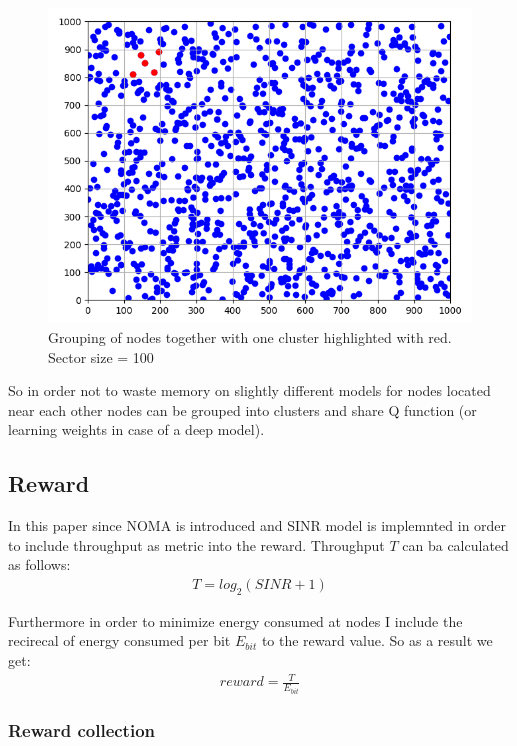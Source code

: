 \begin{figure}[H]
\centering
\includegraphics[scale=0.7]{figures/my_sectors.PNG}
  \caption{Grouping of nodes together with one cluster highlighted with red. Sector size = 100}
  \label{fig:my_sectors}
\end{figure}

So in order not to waste memory on slightly different models for nodes located near each other nodes can be grouped into clusters and share Q function (or learning weights
in case of a deep model). 

\subsection{Reward}

In this paper since NOMA is introduced and SINR model is 
implemnted in order to include throughput as metric into the
reward. Throughput $T$ can ba calculated as follows: 
\begin{align}
T = log_2(SINR + 1)
\end{align}

Furthermore in order to minimize energy consumed at nodes I 
include the recirecal of energy consumed per bit $E_{bit}$ to the reward
value. So as a result we get:
\begin{align}
    reward = \frac{T}{E_{bit}}
\end{align}

\subsubsection{Reward collection}


